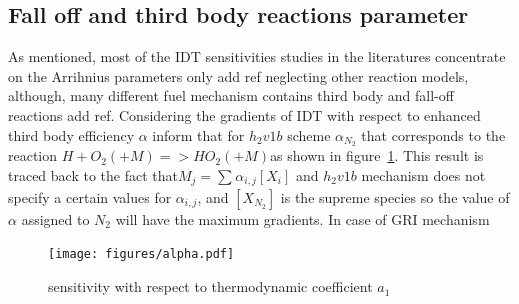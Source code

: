 \documentclass[preprint,review,12pt]{elsarticle}
\begin{document}
%
%
 

\subsection{Fall off and third body reactions parameter}
As mentioned, most of the IDT sensitivities studies in the literatures concentrate on the Arrihnius parameters only{\color{red} add ref} neglecting other reaction models, although, many different fuel mechanism contains third body and fall-off reactions{\color{red} add ref}. Considering the gradients of IDT with respect to enhanced third body efficiency $\alpha$ inform that for $h_2v1b$ scheme $\alpha_{N_2}$ that corresponds to the reaction $H+O_2 (+M)=> HO_2(+M)$as shown in figure~\ref{fig:figure9}. This result is traced back to the fact that$M_j=\sum_{}^{}\alpha_{i,j} [X_i]$  and $h_2v1b$ mechanism does not specify a certain values for $\alpha_{i,j}$, and $[X_{N_2}]$ is the supreme species so the value of $\alpha$ assigned to $N_2$ will have the maximum gradients.
 In case of GRI mechanism 
\begin{figure}
\centering
 {\texttt{[image: figures/alpha.pdf]}}
\caption{sensitivity with respect to thermodynamic coefficient $a_1$}
    \label{fig:figure9}
\end{figure}
\end{document}
